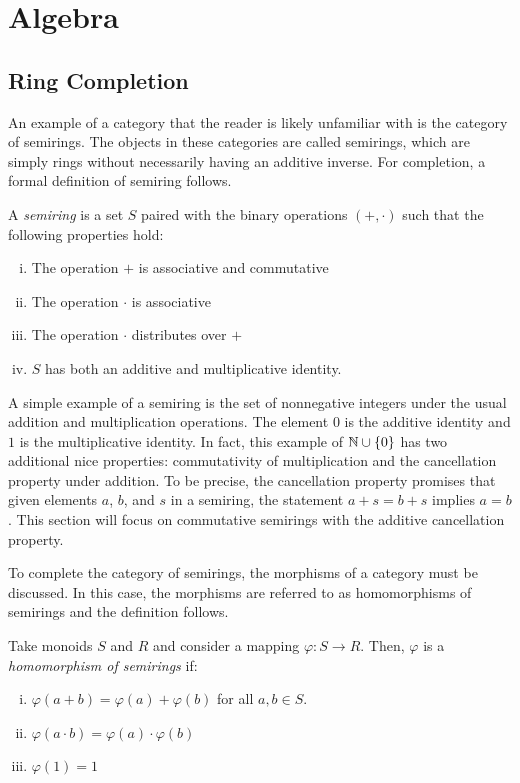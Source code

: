 \documentclass[../sean_thesis.tex]{subfiles}
\begin{document}
\chapter{Algebra}

\section{Ring Completion}
An example of a category that the reader is likely unfamiliar with is the category of semirings. The objects in these categories are called semirings, which are simply rings without necessarily having an additive inverse. For completion, a formal definition of semiring follows.

\begin{definition}[Semiring]
	\label{def:semiring}
	A \emph{semiring} is a set $S$ paired with the binary operations $(+,\cdot)$ such that the following properties hold:
\vspace{-\varparskip}
\begin{enumerate}[(i)]
	\item The operation $+$ is associative and commutative
	\item The operation $\cdot$ is associative
	\item The operation $\cdot$ distributes over $+$
	\item $S$ has both an additive and multiplicative identity.
\end{enumerate}
\end{definition}

A simple example of a semiring is the set of nonnegative integers under the usual addition and multiplication operations. The element $0$ is the additive identity and $1$ is the multiplicative identity. In fact, this example of $\mathbb{N} \cup \left\{0\right\}$ has two additional nice properties: commutativity of multiplication and the cancellation property under addition. To be precise, the cancellation property promises that given elements $a$, $b$, and $s$ in a semiring, the statement $a+s=b+s$ implies $a=b$. This section will focus on commutative semirings with the additive cancellation property.

To complete the category of semirings, the morphisms of a category must be discussed. In this case, the morphisms are referred to as homomorphisms of semirings and the definition follows.

\begin{definition}
	Take monoids $S$ and $R$ and consider a mapping $\varphi: S \to R$. Then, $\varphi$ is a \emph{homomorphism of semirings} if:
\vspace{-\varparskip}
	\begin{enumerate}[(i)]
		\item $\varphi(a+b) = \varphi(a)+\varphi(b)$ for all $a,b \in S$.
		\item $\varphi(a\cdot b) = \varphi(a)\cdot \varphi(b)$
		\item $\varphi(1) = 1$
	\end{enumerate}
\end{definition}
	
\end{document}
